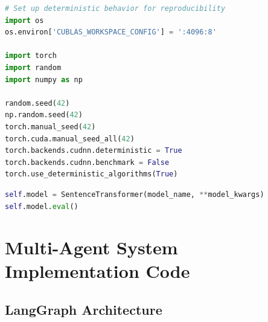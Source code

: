 \begin{lstlisting}[breaklines=true,language=python, caption=Deterministic Configuration for Reproducibility, label=code:deterministic-config]
# Set up deterministic behavior for reproducibility
import os
os.environ['CUBLAS_WORKSPACE_CONFIG'] = ':4096:8'

import torch
import random
import numpy as np

random.seed(42)
np.random.seed(42)
torch.manual_seed(42)
torch.cuda.manual_seed_all(42)
torch.backends.cudnn.deterministic = True
torch.backends.cudnn.benchmark = False
torch.use_deterministic_algorithms(True)
\end{lstlisting}

\begin{lstlisting}[breaklines=true,language=python, caption=Model Evaluation Mode Setting, label=code:model-eval-mode]
self.model = SentenceTransformer(model_name, **model_kwargs)
self.model.eval()
\end{lstlisting}

\section*{Multi-Agent System Implementation Code}

\subsection*{LangGraph Architecture}


